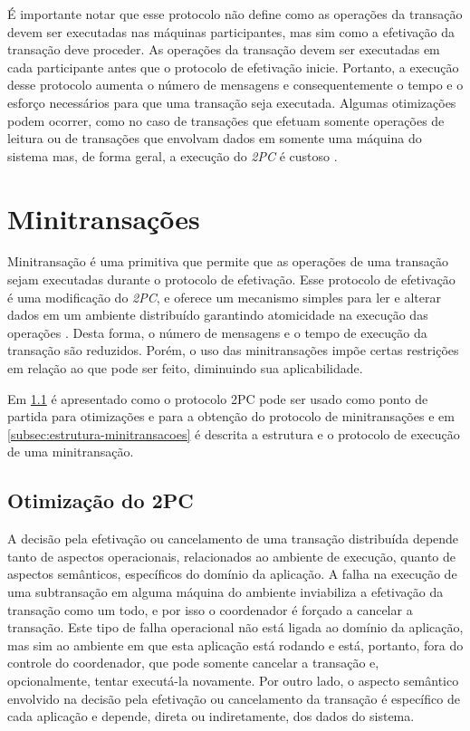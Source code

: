 \documentclass[11pt,twoside,a4paper]{book}
\begin{document}
É importante notar que esse protocolo não define como as operações da transação devem ser executadas nas máquinas participantes, mas sim como a efetivação da transação deve proceder. As operações da transação devem ser executadas em cada participante antes que o protocolo de efetivação inicie. Portanto, a execução desse protocolo aumenta o número de mensagens e consequentemente o tempo e o esforço necessários para que uma transação seja executada. Algumas otimizações podem ocorrer, como no caso de transações que efetuam somente operações de leitura ou de transações que envolvam dados em somente uma máquina do sistema mas, de forma geral, a execução do \emph{2PC} é custoso \cite{gray-lamport}.

\section{Minitransações}
\label{sec:minitransacoes}
Minitransação é uma primitiva que permite que as operações de uma transação sejam executadas durante o protocolo de efetivação. Esse protocolo de efetivação é uma modificação do \emph{2PC}, e oferece um mecanismo simples para ler e alterar dados em um ambiente distribuído garantindo atomicidade na execução das operações \cite{sinfonia}. Desta forma, o número de mensagens e o tempo de execução da transação são reduzidos. Porém, o uso das minitransações impõe certas restrições em relação ao que pode ser feito, diminuindo sua aplicabilidade.

Em \ref{subsec:derivando-minitransacoes} é apresentado como o protocolo 2PC pode ser usado como ponto de partida para otimizações e para a obtenção do protocolo de minitransações e em \ref{subsec:estrutura-minitransacoes} é descrita a estrutura e o protocolo de execução de uma minitransação.

\subsection{Otimização do 2PC}
\label{subsec:derivando-minitransacoes}
A decisão pela efetivação ou cancelamento de uma transação distribuída depende tanto de aspectos operacionais, relacionados ao ambiente de execução, quanto de aspectos semânticos, específicos do domínio da aplicação. A falha na execução de uma subtransação em alguma máquina do ambiente inviabiliza a efetivação da transação como um todo, e por isso o coordenador é forçado a cancelar a transação. Este tipo de falha operacional não está ligada ao domínio da aplicação, mas sim ao ambiente em que esta aplicação está rodando e está, portanto, fora do controle do coordenador, que pode somente cancelar a transação e, opcionalmente, tentar executá-la novamente. Por outro lado, o aspecto semântico envolvido na decisão pela efetivação ou cancelamento da transação é específico de cada aplicação e depende, direta ou indiretamente, dos dados do sistema.
\end{document}
